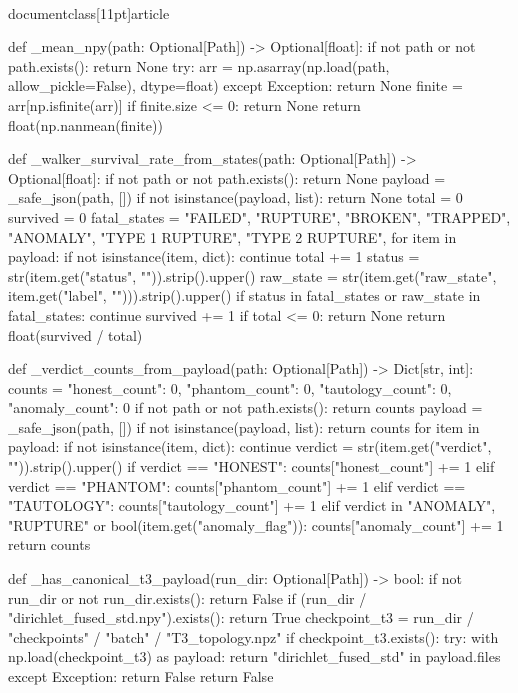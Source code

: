 \\documentclass[11pt]{article}
\begin{document}
\begin{CodeBlock}
def _mean_npy(path: Optional[Path]) -> Optional[float]:
    if not path or not path.exists():
        return None
    try:
        arr = np.asarray(np.load(path, allow_pickle=False), dtype=float)
    except Exception:
        return None
    finite = arr[np.isfinite(arr)]
    if finite.size <= 0:
        return None
    return float(np.nanmean(finite))


def _walker_survival_rate_from_states(path: Optional[Path]) -> Optional[float]:
    if not path or not path.exists():
        return None
    payload = _safe_json(path, [])
    if not isinstance(payload, list):
        return None
    total = 0
    survived = 0
    fatal_states = {
        "FAILED",
        "RUPTURE",
        "BROKEN",
        "TRAPPED",
        "ANOMALY",
        "TYPE 1 RUPTURE",
        "TYPE 2 RUPTURE",
    }
    for item in payload:
        if not isinstance(item, dict):
            continue
        total += 1
        status = str(item.get("status", "")).strip().upper()
        raw_state = str(item.get("raw_state", item.get("label", ""))).strip().upper()
        if status in fatal_states or raw_state in fatal_states:
            continue
        survived += 1
    if total <= 0:
        return None
    return float(survived / total)


def _verdict_counts_from_payload(path: Optional[Path]) -> Dict[str, int]:
    counts = {"honest_count": 0, "phantom_count": 0, "tautology_count": 0, "anomaly_count": 0}
    if not path or not path.exists():
        return counts
    payload = _safe_json(path, [])
    if not isinstance(payload, list):
        return counts
    for item in payload:
        if not isinstance(item, dict):
            continue
        verdict = str(item.get("verdict", "")).strip().upper()
        if verdict == "HONEST":
            counts["honest_count"] += 1
        elif verdict == "PHANTOM":
            counts["phantom_count"] += 1
        elif verdict == "TAUTOLOGY":
            counts["tautology_count"] += 1
        elif verdict in {"ANOMALY", "RUPTURE"} or bool(item.get("anomaly_flag")):
            counts["anomaly_count"] += 1
    return counts


def _has_canonical_t3_payload(run_dir: Optional[Path]) -> bool:
    if not run_dir or not run_dir.exists():
        return False
    if (run_dir / "dirichlet_fused_std.npy").exists():
        return True
    checkpoint_t3 = run_dir / "checkpoints" / "batch" / "T3_topology.npz"
    if checkpoint_t3.exists():
        try:
            with np.load(checkpoint_t3) as payload:
                return "dirichlet_fused_std" in payload.files
        except Exception:
            return False
    return False



\end{CodeBlock}
\end{document}
